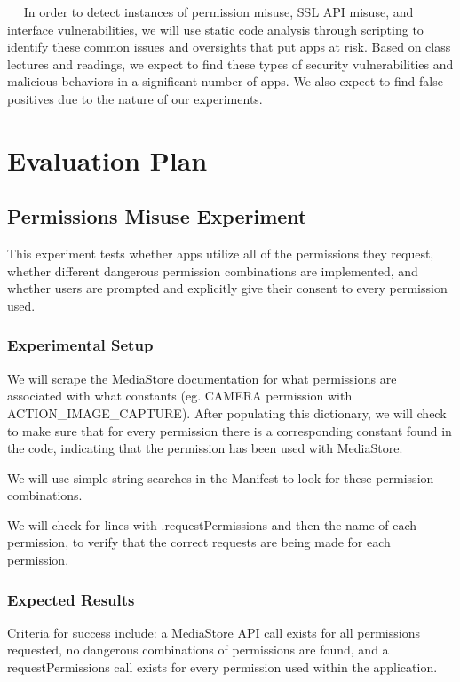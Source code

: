 \documentclass[10pt,twocolumn,pdftex]{article}
\begin{document}
   In order to detect instances of permission misuse, SSL API misuse, and interface vulnerabilities, we will use static code analysis through scripting to identify these common issues and oversights that put apps at risk. Based on class lectures and readings, we expect to find these types of security vulnerabilities and malicious behaviors in a significant number of apps. We also expect to find false positives due to the nature of our experiments. 

\section{Evaluation Plan}


\subsection{Permissions Misuse Experiment}

    This experiment tests whether apps utilize all of the permissions they request, whether different dangerous permission combinations are implemented, and whether users are prompted and explicitly give their consent to every permission used.

    \subsubsection{Experimental Setup}
    We will scrape the MediaStore documentation for what permissions are associated with what constants (eg. CAMERA permission with ACTION\_IMAGE\_CAPTURE). After populating this dictionary, we will check to make sure that for every permission there is a corresponding constant found in the code, indicating that the permission has been used with MediaStore.

    We will use simple string searches in the Manifest to look for these permission combinations. 

    We will check for lines with .requestPermissions and then the name of each permission, to verify that the correct requests are being made for each permission.

    \subsubsection{Expected Results}

    Criteria for success include:
    a MediaStore API call exists for all permissions requested, 
    no dangerous combinations of permissions are found, and
    a requestPermissions call exists for every permission used within the application.
\end{document}
